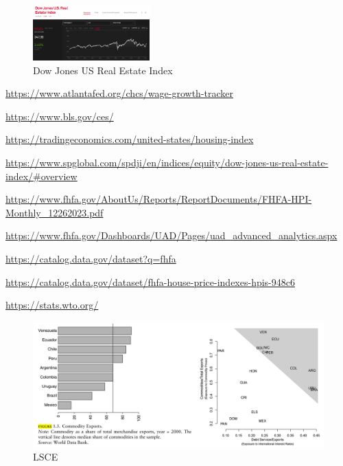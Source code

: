 \documentclass[
]{article}
\begin{document}
\begin{figure}
\hypertarget{fig:label}{%
\centering
\includegraphics[width=0.4\textwidth,height=0.4\textheight]{djusrei_1423.png}
\caption{Dow Jones US Real Estate Index}\label{fig:label}
}
\end{figure}

\url{https://www.atlantafed.org/chcs/wage-growth-tracker}

\url{https://www.bls.gov/ces/}

\url{https://tradingeconomics.com/united-states/housing-index}

\url{https://www.spglobal.com/spdji/en/indices/equity/dow-jones-us-real-estate-index/\#overview}

\url{https://www.fhfa.gov/AboutUs/Reports/ReportDocuments/FHFA-HPI-Monthly_12262023.pdf}

\url{https://www.fhfa.gov/Dashboards/UAD/Pages/uad_advanced_analytics.aspx}

\url{https://catalog.data.gov/dataset?q=fhfa}

\url{https://catalog.data.gov/dataset/fhfa-house-price-indexes-hpis-948c6}

\url{https://stats.wto.org/}

\begin{figure}
\hypertarget{fig:label}{%
\centering
\includegraphics[width=1\textwidth,height=1\textheight]{lsce.png}
\caption{LSCE}\label{fig:label}
}
\end{figure}
\end{document}
